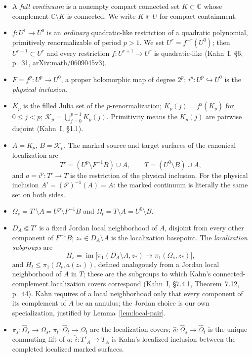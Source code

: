 \documentclass[11pt,reqno]{amsart}
\theoremstyle{definition}
\theoremstyle{remark}
\begin{document}
\begin{itemize}
\item A \emph{full continuum} is a nonempty compact connected set \(K\subset\mathbb C\) whose complement \(\mathbb C\setminus K\) is connected.  We write \(K\Subset U\) for compact containment.
\item \(f\colon U^1\to U^0\) is an \emph{ordinary} quadratic-like restriction of a quadratic polynomial, primitively renormalizable of period \(p>1\).  We set \(U^r=f^{-r}(U^0)\); then \(U^{r+1}\subset U^r\) and every restriction \(f\colon U^{r+1}\to U^r\) is quadratic-like (Kahn~I, \S6, p.~31, arXiv:math/0609045v3).
\item \(F=f^p\colon U^p\to U^0\), a proper holomorphic map of degree \(2^p\); \(i^p\colon U^p\hookrightarrow U^0\) is the \emph{physical inclusion}.
\item \(K_p\) is the filled Julia set of the \(p\)-renormalization; \(K_p(j)=f^j(K_p)\) for \(0\le j<p\); \(\mathcal K_p=\bigcup_{j=0}^{p-1}K_p(j)\).  Primitivity means the \(K_p(j)\) are pairwise disjoint (Kahn~I, \S1.1).
\item \(A=K_p\), \(B=\mathcal K_p\).  The marked source and target surfaces of the canonical localization are
\[
 T'=(U^p\setminus F^{-1}B)\cup A,
 \qquad
 T=(U^0\setminus B)\cup A,                     \tag{1.1}
\]
and \(a=i^p\colon T'\to T\) is the restriction of the physical inclusion.  For the physical inclusion \(A'=(i^p)^{-1}(A)=A\): the marked continuum is literally the same set on both sides.
\item \(\Omega_s=T'\setminus A=U^p\setminus F^{-1}B\) and \(\Omega_t=T\setminus A=U^0\setminus B\).
\item \(D_A\Subset T'\) is a fixed Jordan local neighborhood of \(A\), disjoint from every other component of \(F^{-1}B\); \(z_*\in D_A\setminus A\) is the localization basepoint.  The \emph{localization subgroups} are
\[
 H_s=\operatorname{im}\bigl[\pi_1(D_A\setminus A,z_*)\longrightarrow\pi_1(\Omega_s,z_*)\bigr],  \tag{5.2}
\]
and \(H_t\le\pi_1(\Omega_t,a(z_*))\), defined analogously from a Jordan local neighborhood of \(A\) in \(T\); these are the subgroups to which Kahn's connected-complement localization covers correspond (Kahn~I, \S7.4.1, Theorem~7.12, p.~44).  Kahn requires of a local neighborhood only that every component of its complement of \(A\) be an annulus; the Jordan choice is our own specialization, justified by Lemma~\ref{lem:local-pair}.
\item \(\pi_s\colon\widehat\Omega_s\to\Omega_s\), \(\pi_t\colon\widehat\Omega_t\to\Omega_t\) are the localization covers; \(\widehat a\colon\widehat\Omega_s\to\widehat\Omega_t\) is the unique commuting lift of \(a\); \(\widehat i\colon T'_A\to T_A\) is Kahn's localized inclusion between the completed localized marked surfaces.

\end{itemize}
\end{document}
